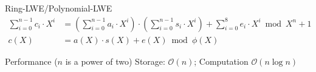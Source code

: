 \documentclass[xcolor=table,10pt,aspectratio=169]{beamer}
\begin{document}
\begin{frame}[label={sec:orgdb6cc74}]{Ring-LWE/Polynomial-LWE}
\begin{align*}
\sum_{i=0}^{n-1} c_{i} \cdot X^{i} &= \left(\sum_{i=0}^{n-1} a_{i} \cdot X^{i}\right) \cdot \left(\sum_{i=0}^{n-1} s_{i} \cdot X^{i}\right) + \sum_{i=0}^{8} e_{i} \cdot X^{i} \bmod X^{n} +1\\
c(X) &= a(X) \cdot s(X) + e(X) \bmod \phi(X)
\end{align*}

\begin{block}{Performance (\(n\) is a power of two)}
Storage: \(\mathcal{O}(n)\); Computation \(\mathcal{O}(n \log n)\)
\end{block}

\end{frame}
\end{document}
